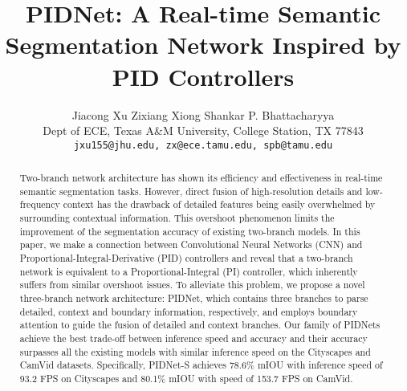 \documentclass[10pt,twocolumn,letterpaper]{article}
\begin{document}
\title{PIDNet: A Real-time Semantic Segmentation Network Inspired by PID Controllers}

\author{Jiacong Xu \qquad
    Zixiang Xiong  \qquad
    Shankar P. Bhattacharyya \\
    Dept of ECE, Texas A\&M University, College Station, TX 77843 \\
{\tt\small jxu155@jhu.edu, zx@ece.tamu.edu, spb@tamu.edu}
}
\maketitle

\begin{abstract}
Two-branch network architecture has shown its efficiency and effectiveness in real-time semantic segmentation tasks. However, direct fusion of high-resolution details and low-frequency context has the drawback of detailed features being easily overwhelmed by surrounding contextual information. This overshoot phenomenon limits the improvement of the segmentation accuracy of existing two-branch models. In this paper, we make a connection between Convolutional Neural Networks (CNN) and Proportional-Integral-Derivative (PID) controllers and reveal that a two-branch network is equivalent to a Proportional-Integral (PI) controller, which inherently suffers from similar overshoot issues. To alleviate this problem, we propose a novel three-branch network architecture: PIDNet, which contains three branches to parse detailed, context and boundary information, respectively, and employs boundary attention to guide the fusion of detailed and context branches. Our family of PIDNets achieve the best trade-off between inference speed and accuracy and their accuracy surpasses all the existing models with similar inference speed on the Cityscapes and CamVid datasets. Specifically, PIDNet-S achieves 78.6\% mIOU with inference speed of 93.2 FPS on Cityscapes and 80.1\% mIOU with speed of 153.7 FPS on CamVid.
\end{abstract}
\end{document}
